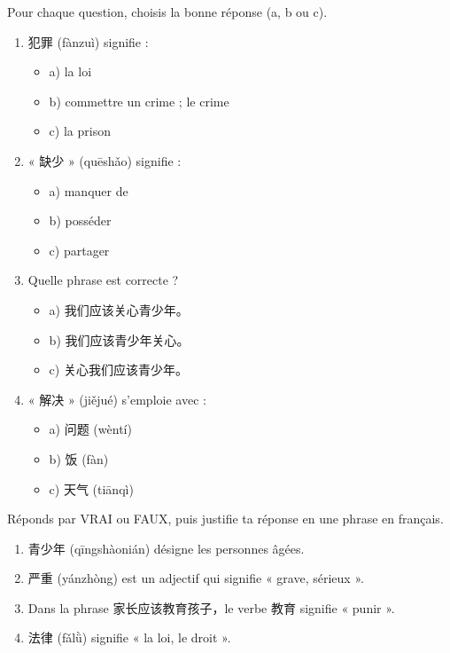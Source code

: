 \documentclass[11pt]{article}
\begin{document}
\begin{exercice}
Pour chaque question, choisis la bonne réponse (a, b ou c).
\begin{enumerate}
\item 犯罪 (fànzuì) signifie :
\begin{itemize}
\item a) la loi
\item b) commettre un crime ; le crime
\item c) la prison
\end{itemize}
\item « 缺少 » (quēshǎo) signifie :
\begin{itemize}
\item a) manquer de
\item b) posséder
\item c) partager
\end{itemize}
\item Quelle phrase est correcte ?
\begin{itemize}
\item a) 我们应该关心青少年。
\item b) 我们应该青少年关心。
\item c) 关心我们应该青少年。
\end{itemize}
\item « 解决 » (jiějué) s'emploie avec :
\begin{itemize}
\item a) 问题 (wèntí)
\item b) 饭 (fàn)
\item c) 天气 (tiānqì)
\end{itemize}
\end{enumerate}
\end{exercice}

\begin{exercice}
Réponds par VRAI ou FAUX, puis justifie ta réponse en une phrase en français.
\begin{enumerate}
\item 青少年 (qīngshàonián) désigne les personnes âgées.
\item 严重 (yánzhòng) est un adjectif qui signifie « grave, sérieux ».
\item Dans la phrase 家长应该教育孩子，le verbe 教育 signifie « punir ».
\item 法律 (fǎlǜ) signifie « la loi, le droit ».
\end{enumerate}
\end{exercice}
\end{document}

